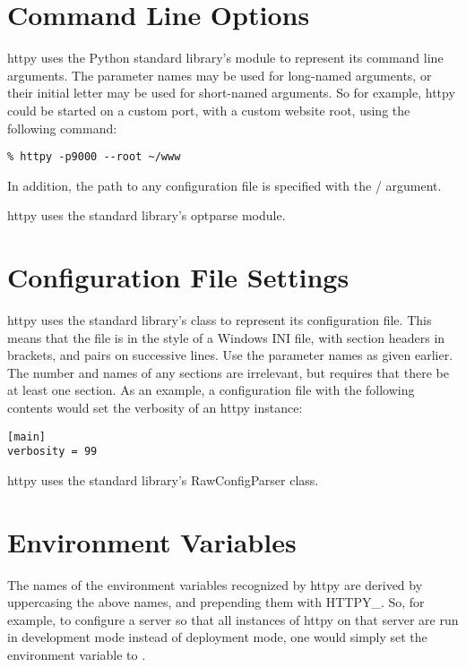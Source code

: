 \section{Command Line Options}

httpy uses the Python standard library's  module to represent
its command line arguments. The parameter names may be used for long-named
arguments, or their initial letter may be used for short-named arguments. So for
example, httpy could be started on a custom port, with a custom website root,
using the following command:

\begin{verbatim}
% httpy -p9000 --root ~/www
\end{verbatim}

In addition, the path to any configuration file is specified with the
/ argument.

\begin{seealso}
          {httpy uses the standard library's optparse module.}
\end{seealso}




\section{Configuration File Settings}

httpy uses the standard library's  class to represent
its configuration file. This means that the file is in the style of a Windows
INI file, with section headers in brackets, and  pairs on
successive lines. Use the parameter names as given earlier. The number and names
of any sections are irrelevant, but  requires that there
be at least one section. As an example, a configuration file with the following
contents would set the verbosity of an httpy instance:

\begin{verbatim}
[main]
verbosity = 99
\end{verbatim}

\begin{seealso}
          {httpy uses the standard library's RawConfigParser class.}
\end{seealso}




\section{Environment Variables}

The names of the environment variables recognized by httpy are derived by
uppercasing the above names, and prepending them with HTTPY_. So, for example,
to configure a server so that all instances of httpy on that server are run in
development mode instead of deployment mode, one would simply set the
environment variable  to .
